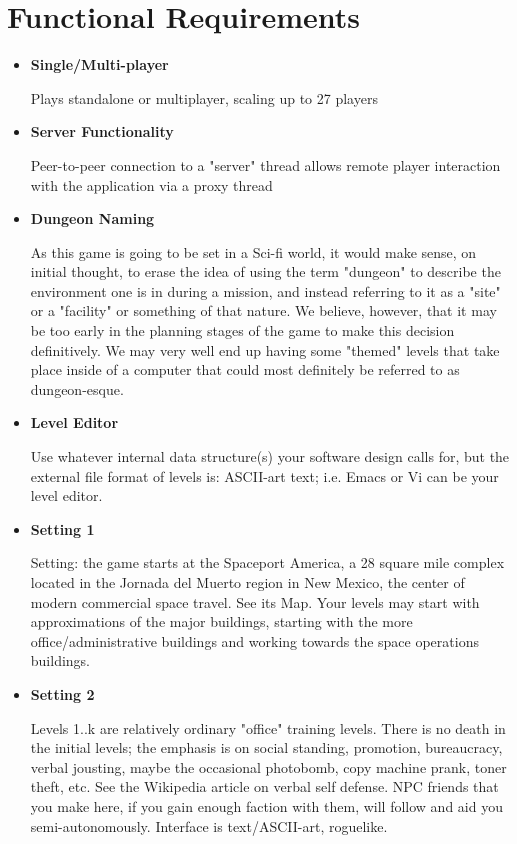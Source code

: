 \documentclass[12pt]{report}
\begin{document}
\section{Functional Requirements}
\begin{itemize}
	\item \textbf{Single/Multi-player}
	
	Plays standalone or multiplayer, scaling up to 27 players
	
	\item \textbf{Server Functionality}
	
	Peer-to-peer connection to a "server" thread allows remote player
	interaction with the application via a proxy thread
	
	\item \textbf{Dungeon Naming} %
	
	As this game is going to be set in a Sci-fi world, it would make sense, on 
	initial thought, to erase the idea of using the term "dungeon" to describe 
	the environment one is in during a mission, and instead referring to it as 
	a "site" or a "facility" or something of that nature. We believe, however, 
	that it may be too early in the planning stages of the game to make this 
	decision definitively. We may very well end up having some "themed" levels 
	that take place inside of a computer that could most definitely be referred 
	to as dungeon-esque. 
	
	\item \textbf{Level Editor}
	
	Use whatever internal data structure(s) your software design calls
	for, but the external file format of levels is: ASCII-art text; i.e.
	Emacs or Vi can be your level editor.
	
	\item \textbf{Setting 1}
	
	Setting: the game starts at the Spaceport America, a 28 square mile
	complex located in the Jornada del Muerto region in New Mexico, the
	center of modern commercial space travel. See its Map. Your levels may
	start with approximations of the major buildings, starting with the more
	office/administrative buildings and working towards the space operations
	buildings.
	
	\item \textbf{Setting 2}
	
	Levels 1..k are relatively ordinary "office" training levels. There is
	no death in the initial levels; the emphasis is on social standing,
	promotion, bureaucracy, verbal jousting, maybe the occasional photobomb,
	copy machine prank, toner theft, etc. See the Wikipedia article on
	verbal self defense. NPC friends that you make here, if you gain enough
	faction with them, will follow and aid you semi-autonomously. Interface
	is text/ASCII-art, roguelike. 
	

\end{itemize}
\end{document}
